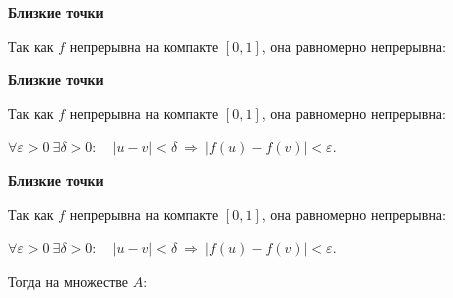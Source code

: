 \documentclass[11pt]{article}
\begin{document}
\newpage

\begin{center}
{\color{notaeYELLOW}\bfseries\fontsize{44}{52}\selectfont Близкие точки}
\end{center}
\vspace*{\fill}
\begin{center}
\fontsize{36}{43}\selectfont
Так как $f$ непрерывна на компакте $[0,1]$, она равномерно непрерывна:\par\vspace{0.4in}
\end{center}
\vspace*{\fill}

\newpage

\begin{center}
{\color{notaeYELLOW}\bfseries\fontsize{44}{52}\selectfont Близкие точки}
\end{center}
\vspace*{\fill}
\begin{center}
\fontsize{36}{43}\selectfont
Так как $f$ непрерывна на компакте $[0,1]$, она равномерно непрерывна:\par\vspace{0.4in}
$\forall \varepsilon>0\ \exists \delta>0: \quad |u-v|<\delta\ \Rightarrow\ |f(u)-f(v)|<\varepsilon.$\par\vspace{0.4in}
\end{center}
\vspace*{\fill}

\newpage

\begin{center}
{\color{notaeYELLOW}\bfseries\fontsize{44}{52}\selectfont Близкие точки}
\end{center}
\vspace*{\fill}
\begin{center}
\fontsize{36}{43}\selectfont
Так как $f$ непрерывна на компакте $[0,1]$, она равномерно непрерывна:\par\vspace{0.4in}
$\forall \varepsilon>0\ \exists \delta>0: \quad |u-v|<\delta\ \Rightarrow\ |f(u)-f(v)|<\varepsilon.$\par\vspace{0.4in}
Тогда на множестве $A$:\par\vspace{0.4in}
\end{center}
\vspace*{\fill}

\newpage
\end{document}
